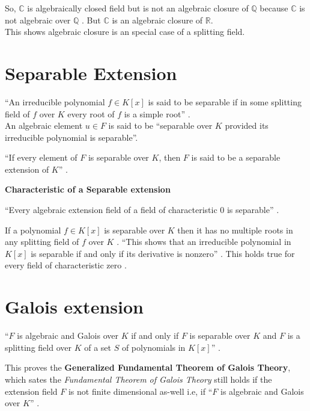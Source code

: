 So, \(\mathbb{C}\) is algebraically closed field but is not an algebraic closure of \(\mathbb{Q}\) because \(\mathbb{C}\) is not algebraic over \(\mathbb{Q}\) \cite{hunger}.
But \(\mathbb{C}\) is an algebraic closure of \(\mathbb{R}\).\\
This shows algebraic closure is an special case of a splitting field.

\section{Separable Extension}
``An irreducible polynomial \(f \in K[x]\) is said to be separable if in some splitting field of \(f\) over \(K\) every root of \(f\) is a simple root'' \cite{hunger}.\\
An algebraic element \(u \in F\) is said to be ``separable over \(K\) provided its irreducible polynomial is separable''\cite{hunger}.
\begin{definition}
  ``If every element of \(F\) is separable over \(K\), then \(F\) is said to be a separable extension of \(K\)'' \cite{hunger}.\\[3mm]
\end{definition}
\noindent
\textbf{Characteristic of a Separable extension}
\begin{remark}
  ``Every algebraic extension field of a field of characteristic \(0\) is separable'' \cite{hunger}.
  \end{remark}
If a polynomial \(f \in K[x]\) is separable over \(K\) then it has no multiple roots in any splitting field of \(f\) over \(K\) \cite{hunger}. ``This shows that an irreducible polynomial in \(K[x]\) is separable if and only if its derivative is nonzero'' \cite{hunger}. This holds true for every field of characteristic zero \cite{hunger}.

\section{Galois extension}
\begin{theorem}
  ``\(F\) is algebraic and Galois over \(K\) if and only if \(F\) is separable over \(K\) and \(F\) is a splitting field over \(K\) of a set \(S\) of polynomials in \(K[x]\)'' \cite{hunger}.\\
  \end{theorem}

This proves the \textbf{Generalized Fundamental Theorem of Galois Theory},\\
which sates the \textit{Fundamental Theorem of Galois Theory} still holds if the extension field \(F\) is not finite dimensional as-well i.e, if ``\(F\) is algebraic and Galois over \(K\)'' \cite{hunger}.
